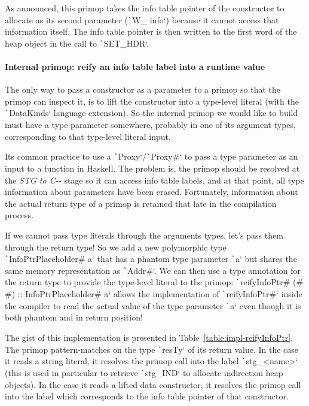 \documentclass[english]{jflart}
\begin{document}
As announced, this primop takes the info table pointer of the constructor to allocate as its second parameter (\texttt`W_ info`) because it cannot access that information itself. The info table pointer is then written to the first word of the heap object in the call to \texttt`SET_HDR`.

\paragraph{Internal primop: reify an info table label into a runtime value}

The only way to pass a constructor as a parameter to a primop so that the primop can inspect it, is to lift the constructor into a type-level literal (with the \texttt`DataKinds` language extension). So the internal primop we would like to build must have a type parameter somewhere, probably in one of its argument types, corresponding to that type-level literal input.

Its common practice to use a \texttt`Proxy`/\texttt`Proxy#` to pass a type parameter as an input to a function in Haskell. The problem is, the primop should be resolved at the \emph{STG to C-{}-} stage so it can access info table labels, and at that point, all type information about parameters have been erased. Fortunately, information about the actual return type of a primop is retained that late in the compilation process.

If we cannot pass type literals through the arguments types, let's pass them through the return type! So we add a new polymorphic type \texttt`InfoPtrPlaceholder# a` that has a phantom type parameter \texttt`a` but shares the same memory representation as \texttt`Addr#`. We can then use a type annotation for the return type to provide the type-level literal to the primop: \texttt`reifyInfoPtr# (# #) :: InfoPtrPlaceholder# a` allows the implementation of \texttt`reifyInfoPtr#` inside the compiler to read the actual value of the type parameter \texttt`a` even though it is both phantom and in return position!

The gist of this implementation is presented in Table~\ref{table:impl-reifyInfoPtr}. The primop pattern-matches on the type \texttt`resTy` of its return value. In the case it reads a string literal, it resolves the primop call into the label \texttt`stg_<name>` (this is used in particular to retrieve \texttt`stg_IND` to allocate indirection heap objects). In the case it reads a lifted data constructor, it resolves the primop call into the label which corresponds to the info table pointer of that constructor.
\end{document}
